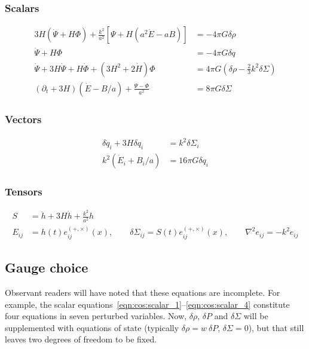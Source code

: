 \subsubsection{Scalars}
\begin{align}
  3H\left( \dot{\Psi} + H \Phi  \right) + \frac{k^2}{a^2}\left[ \Psi + H\left( a^2\dot{E}-aB \right) \right] &= -4\pi G \delta\rho
  \label{eqn:cos:scalar_1} \\
  \dot{\Psi} + H \Phi &= -4\pi G \delta q 
  \label{eqn:cos:scalar_2}\\
  \dot{\Psi} + 3 H \dot{\Psi} + H \dot{\Phi} + \left( 3H^2 + 2\dot{H} \right)\Phi &= 4\pi G \left( \delta\rho - \frac{2}{3}k^2\delta\Sigma \right)
  \label{eqn:cos:scalar_3}\\
  \left( \partial_t + 3H \right)\left( \dot{E}-B/a \right) + \frac{\Psi-\Phi}{a^2} &= 8\pi G \delta\Sigma
  \label{eqn:cos:scalar_4}
\end{align}
\subsubsection{Vectors}
\begin{align}
  \delta \dot{q}_i + 3H \delta q_i &= k^2 \delta \Sigma_i \\
  k^2\left( \dot{E}_i + B_i/a  \right) &= 16\pi G \delta q_i
\end{align}


\subsubsection{Tensors}
\begin{align}
  S&=\ddot{h} + 3H \dot{h} + \frac{k^2}{a^2}h \\
  E_{ij} &= h(t) e_{ij}^{(+,\times)}(x), \qquad 
  \delta\Sigma_{ij} = S(t) e_{ij}^{(+,\times)}(x), \qquad 
  \nabla^2e_{ij} = -k^2 e_{ij}
\end{align}

\subsection{Gauge choice}
Observant readers will have noted that these equations are incomplete. For example, the scalar equations~\eqref{eqn:cos:scalar_1}--\eqref{eqn:cos:scalar_4} constitute four equations in seven perturbed variables. Now, $\delta\rho$, $\delta P$ and $\delta\Sigma$ will be supplemented with equations of state (typically $\delta\rho = w\:\delta P$, $\delta\Sigma=0$), but that still leaves two degrees of freedom to be fixed.

